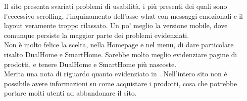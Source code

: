 Il sito presenta svariati problemi di usabilità, i più presenti dei quali sono l'eccessivo scrolling, l'inquinamento dell'asse what con messaggi emozionali e il layout veramente troppo rilassato. Un po' meglio la versione mobile, dove comunque persiste la maggior parte dei problemi evidenziati.\\
Non è molto felice la scelta, nella Homepage e nel menu, di dare particolare risalto DualHome e SmartHome. Sarebbe molto meglio evidenziare pagine di prodotti, e tenere DualHome e SmartHome più nascoste.\\
Merita una nota di riguardo quanto evidenziato in . Nell'intero sito non è possibile avere informazioni su come acquistare i prodotti, cosa che potrebbe portare molti utenti ad abbandonare il sito.